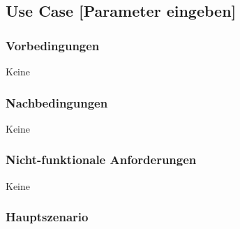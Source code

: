 \subsection{Use Case [Parameter eingeben]}

\subsubsection{Vorbedingungen}
Keine

\subsubsection{Nachbedingungen}
Keine

\subsubsection{Nicht-funktionale Anforderungen}
Keine

\subsubsection{Hauptszenario}

%
%

